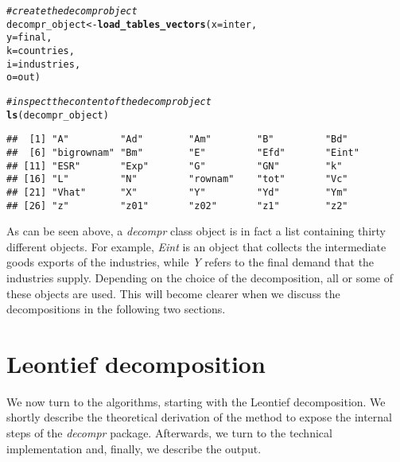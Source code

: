 \documentclass[a4paper,11pt]{article}
\makeatletter
\newcommand{\hlcom}[1]{\textcolor[rgb]{0.678,0.584,0.686}{\textit{#1}}}%
\newcommand{\hlstd}[1]{\textcolor[rgb]{0.345,0.345,0.345}{#1}}%
\newcommand{\hlkwb}[1]{\textcolor[rgb]{0.69,0.353,0.396}{#1}}%
\newcommand{\hlkwc}[1]{\textcolor[rgb]{0.333,0.667,0.333}{#1}}%
\newcommand{\hlkwd}[1]{\textcolor[rgb]{0.737,0.353,0.396}{\textbf{#1}}}%
\newenvironment{kframe}{%
 \def\at@end@of@kframe{}%
 \ifinner\ifhmode%
  \def\at@end@of@kframe{\end{minipage}}%
  \begin{minipage}{\columnwidth}%
 \fi\fi%
 \def\FrameCommand##1{\hskip\@totalleftmargin \hskip-\fboxsep
 \colorbox{shadecolor}{##1}\hskip-\fboxsep
     \hskip-\linewidth \hskip-\@totalleftmargin \hskip\columnwidth}%
 \MakeFramed {\advance\hsize-\width
   \@totalleftmargin\z@ \linewidth\hsize
   \@setminipage}}%
 {\par\unskip\endMakeFramed%
 \at@end@of@kframe}
\newenvironment{knitrout}{}{} %
\makeatother
\begin{document}
\begin{knitrout}
\color{fgcolor}\begin{kframe}
\begin{alltt}
\hlcom{# create the \textit{decompr} object}
\hlstd{decompr_object} \hlkwb{<-} \hlkwd{load_tables_vectors}\hlstd{(} \hlkwc{x} \hlstd{= inter,}
                                       \hlkwc{y} \hlstd{= final,}
                                       \hlkwc{k} \hlstd{= countries,}
                                       \hlkwc{i} \hlstd{= industries,}
                                       \hlkwc{o} \hlstd{= out        )}

\hlcom{# inspect the content of the \textit{decompr} object}
\hlkwd{ls}\hlstd{(decompr_object)}
\end{alltt}
\begin{verbatim}
##  [1] "A"         "Ad"        "Am"        "B"         "Bd"       
##  [6] "bigrownam" "Bm"        "E"         "Efd"       "Eint"     
## [11] "ESR"       "Exp"       "G"         "GN"        "k"        
## [16] "L"         "N"         "rownam"    "tot"       "Vc"       
## [21] "Vhat"      "X"         "Y"         "Yd"        "Ym"       
## [26] "z"         "z01"       "z02"       "z1"        "z2"
\end{verbatim}
\end{kframe}
\end{knitrout}

As can be seen above, a \textit{decompr} class object is in fact a list containing thirty different objects. For example, \textit{Eint} is an object that collects the intermediate goods exports of the industries, while \textit{Y} refers to the final demand that the industries supply. Depending on the choice of the decomposition, all or some of these objects are used. This will become clearer when we discuss the decompositions in the following two sections.


\section{Leontief decomposition}
\label{sec:leontief}
We now turn to the algorithms, starting with the Leontief decomposition. 
We shortly describe the theoretical derivation of the method to expose the internal steps of the \textit{decompr} package. 
Afterwards, we turn to the technical implementation and, finally, we describe the output.
\end{document}
